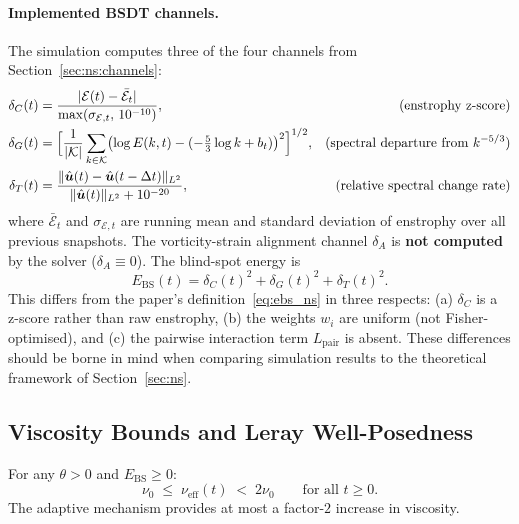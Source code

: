 \paragraph{Implemented BSDT channels.}
The simulation computes three of the four channels from
Section~\ref{sec:ns:channels}:
\begin{align}
  \delta_C(t) &= \frac{|\mathcal{E}(t) - \bar{\mathcal{E}}_t|}
  {\max(\sigma_{\mathcal{E},t},\,10^{-10})},
  &\text{(enstrophy z-score)}\label{eq:app_dC}\\
  \delta_G(t) &= \Bigl[\frac{1}{|\mathcal{K}|}
  \sum_{k\in\mathcal{K}}\bigl(\log E(k,t)
  - (-\tfrac{5}{3}\log k + b_t)\bigr)^2\Bigr]^{1/2},
  &\text{(spectral departure from $k^{-5/3}$)}\label{eq:app_dG}\\
  \delta_T(t) &= \frac{\lVert \hat{\bm{u}}(t)-\hat{\bm{u}}(t-\Delta t) \rVert_{L^2}}
  {\lVert \hat{\bm{u}}(t) \rVert_{L^2} + 10^{-20}},
  &\text{(relative spectral change rate)}\label{eq:app_dT}
\end{align}
where $\bar{\mathcal{E}}_t$ and $\sigma_{\mathcal{E},t}$ are running
mean and standard deviation of enstrophy over all previous snapshots.
The vorticity-strain alignment channel $\delta_A$ is \textbf{not
computed} by the solver ($\delta_A \equiv 0$).  The blind-spot energy
is
\begin{equation}\label{eq:app_ebs}
  E_{\mathrm{BS}}(t) = \delta_C(t)^2 + \delta_G(t)^2 + \delta_T(t)^2.
\end{equation}
This differs from the paper's definition~\eqref{eq:ebs_ns} in three
respects: (a) $\delta_C$ is a z-score rather than raw enstrophy,
(b) the weights $w_i$ are uniform (not Fisher-optimised), and
(c) the pairwise interaction term $L_{\mathrm{pair}}$ is absent.
These differences should be borne in mind when comparing simulation
results to the theoretical framework of Section~\ref{sec:ns}.

\subsection{Viscosity Bounds and Leray Well-Posedness}
\label{app:ns:bounds}

\begin{proposition}\label{prop:nu_bounds}
For any $\theta > 0$ and $E_{\mathrm{BS}} \ge 0$:
\[
  \nu_0 \;\le\; \nu_{\mathrm{eff}}(t) \;<\; 2\nu_0
  \qquad\text{for all } t \ge 0.
\]
The adaptive mechanism provides at most a factor-$2$ increase
in viscosity.
\end{proposition}

